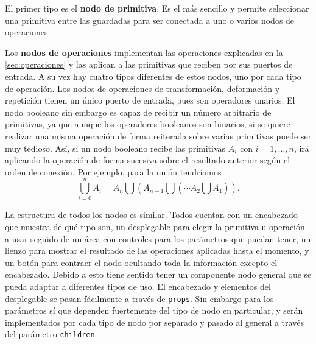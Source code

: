 El primer tipo es el \textbf{nodo de primitiva}. Es el más sencillo y permite seleccionar una primitiva entre las guardadas para ser conectada a uno o varios nodos de operaciones.\newline

Los \textbf{nodos de operaciones} implementan las operaciones explicadas en la \autoref{sec:operaciones} y las aplican a las primitivas que reciben por sus puertos de entrada. A su vez hay cuatro tipos diferentes de estos nodos, uno por cada tipo de operación. Los nodos de operaciones de transformación, deformación y repetición tienen un único puerto de entrada, pues son operadores unarios. El nodo booleano sin embargo es capaz de recibir un número arbitrario de primitivas, ya que aunque los operadores booleanos son binarios, si se quiere realizar una misma operación de forma reiterada sobre varias primitivas puede ser muy tedioso. Así, si un nodo booleano recibe las primitivas $A_i$ con $i=1,\dots, n$, irá aplicando la operación de forma sucesiva sobre el resultado anterior según el orden de conexión. Por ejemplo, para la unión tendríamos
\begin{equation*}
    \bigcup_{i=0}^n A_i = A_n\bigcup (A_{n-1} \bigcup ( \cdots A_2 \bigcup A_1)).
\end{equation*}

La estructura de todos los nodos es similar. Todos cuentan con un encabezado que muestra de qué tipo son, un desplegable para elegir la primitiva u operación a usar seguido de un área con controles para los parámetros que puedan tener, un lienzo para mostrar el resultado de las operaciones aplicadas hasta el momento, y un botón para contraer el nodo ocultando toda la información excepto el encabezado. Debido a esto tiene sentido tener un componente nodo general que se pueda adaptar a diferentes tipos de uso. El encabezado y elementos del desplegable se pasan fácilmente a través de \texttt{props}. Sin embargo para los parámetros sí que dependen fuertemente del tipo de nodo en particular, y serán implementados por cada tipo de nodo por separado y pasado al general a través del parámetro \texttt{children}.\newline

